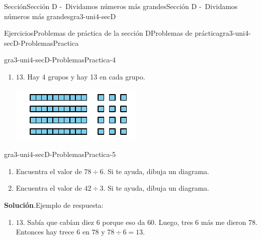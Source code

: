 \documentclass[oneside,10pt,]{article}
\newcommand{\blocktitlefont}{\relax}
\begin{document}
\begin{sectionptx}{Sección}{Sección D -~Dividamos números más grandes}{}{Sección D -~Dividamos números más grandes}{}{}{gra3-uni4-secD}
\begin{exercises-subsection}{Ejercicios}{Problemas de práctica de la sección D}{}{Problemas de práctica}{}{}{gra3-uni4-secD-ProblemasPractica}
\begin{divisionexercise}{2}{}{}{gra3-uni4-secD-ProblemasPractica-4}
\begin{enumerate}[label={(\alph*)}]
\begin{sidebyside}{2}{0}{0}{0}
\end{sidebyside}%
%
\item{}\begin{sidebyside}{2}{0}{0}{0}%
\begin{sbspanel}{0.5}%
\(13\). Hay 4 grupos y hay 13 en cada grupo.%
\end{sbspanel}%
\begin{sbspanel}{0.5}%
\includegraphics[width=\linewidth]{external/svg-source/tikz-file-152444.pdf}
\end{sbspanel}%
\end{sidebyside}%
%
\end{enumerate}
\end{divisionexercise}%
\begin{divisionexercise}{3}{}{}{gra3-uni4-secD-ProblemasPractica-5}%
%
\begin{enumerate}[label={(\alph*)}]
\item{}Encuentra el valor de \(78 \div 6\). Si te ayuda, dibuja un diagrama.%
\item{}Encuentra el valor de \(42 \div 3\). Si te ayuda, dibuja un diagrama.%
\end{enumerate}
\par\smallskip%
\noindent\textbf{\blocktitlefont Solución}.\hypertarget{gra3-uni4-secD-ProblemasPractica-5-2}{}\quad{}Ejemplo de respuesta:%
%
\begin{enumerate}[label={(\alph*)}]
\item{}\(13\). Sabía que cabían diez \(6\) porque eso da \(60\). Luego, tres \(6\) más me dieron \(78\). Entonces hay trece \(6\) en \(78\) y \(78 \div 6 = 13\).%
\begin{image}{0}{1}{0}{}%

\end{image}
\end{enumerate}
\end{divisionexercise}
\end{exercises-subsection}
\end{sectionptx}
\end{document}
